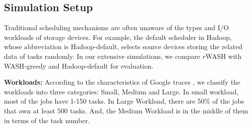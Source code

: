 \documentclass[conference]{IEEEtran}
\begin{document}
\subsection{Simulation Setup}\label{SCM}
Traditional scheduling mechanisms are often unaware of the types and I/O workloads of storage devices. For example, the default scheduler in Hadoop, whose abbreviation is Hadoop-default, selects source devices storing the related data of tasks randomly. In our extensive simulations, we compare $r$WASH with WASH-greedy and Hadoop-default for evaluation.

\textbf{Workloads:} According to the characteristics of Google traces \cite{b20}, we classify the workloads into three categories: Small, Medium and Large. In small workload, most of the jobs have 1-150 tasks. In Large Workload, there are 50\% of the jobs that own at least 500 tasks. And, the Medium Workload is in the middle of them in terms of the task number.
\end{document}
